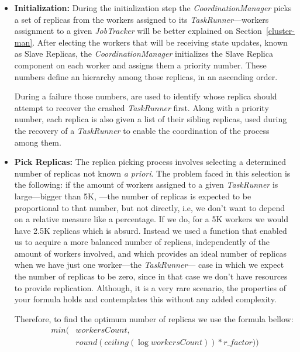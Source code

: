\documentclass[times, 10pt,twocolumn]{article}
\begin{document}
            \begin{itemize}
                
                \item[] {\bfseries Initialization:} During the initialization step the \textit{CoordinationManager} picks a set of replicas from the workers assigned to its \textit{TaskRunner}—workers assignment to a given \textit{JobTracker} will be better explained on Section~\ref{cluster-man}. After electing the workers that will be receiving state updates, known as Slave Replicas, the \textit{CoordinationManager} initializes the Slave Replica component on each worker and assigns them a priority number. These numbers define an hierarchy among those replicas, in an ascending order. 
                
                During a failure those numbers, are used to identify whose replica should attempt to recover the crashed \textit{TaskRunner} first. Along with a priority number, each replica is also given a list of their sibling replicas, used during the recovery of a \textit{TaskRunner} to enable the coordination of the process among them.
                
                \item[] {\bfseries Pick Replicas:} The replica picking process involves selecting a determined number of replicas not known \textit{a priori}. The problem faced in this selection is the following: if the amount of workers assigned to a given \textit{TaskRunner} is large—bigger than 5K, —the number of replicas is expected to be proportional to that number, but not directly, i.e, we don't want to depend on a relative measure like a percentage. If we do, for a 5K workers we would have 2.5K replicas which is absurd. Instead we used a function that enabled us to acquire a more balanced number of replicas, independently of the amount of workers involved, and which provides an ideal number of replicas when we have just one worker—the \textit{TaskRunner}— case in which we expect the number of replicas to be zero, since in that case we don't have resources to provide replication. Although, it is a very rare scenario, the properties of your formula holds and contemplates this without any added complexity. 
                
                Therefore, to find the optimum number of replicas we use the formula bellow:
                 \begingroup
                 \small  
                 \begin{equation*}
                 \begin{aligned}
                    min( & workersCount, \\ & round( ceiling(\log{workersCount})) * r\_factor))
                 \end{aligned}
                 \end{equation*}
                 \endgroup
            

\end{itemize}
\end{document}
